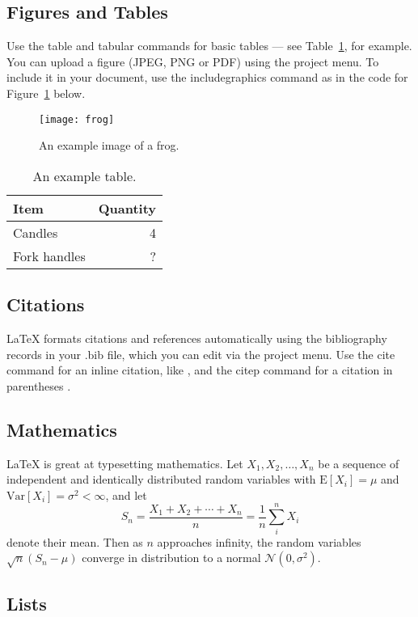\documentclass[fleqn,10pt]{olplainarticle}
\begin{document}
\subsection*{Figures and Tables}

Use the table and tabular commands for basic tables --- see Table~\ref{tab:widgets}, for example. You can upload a figure (JPEG, PNG or PDF) using the project menu. To include it in your document, use the includegraphics command as in the code for Figure~\ref{fig:view} below.

\begin{figure}[ht]
\centering
\texttt{[image: frog]}
\caption{An example image of a frog.}
\label{fig:view}
\end{figure}

\begin{table}[ht]
\centering
\begin{tabular}{l|r}
Item & Quantity \\\hline
Candles & 4 \\
Fork handles & ?  
\end{tabular}
\caption{\label{tab:widgets}An example table.}
\end{table}

\subsection*{Citations}

LaTeX formats citations and references automatically using the bibliography records in your .bib file, which you can edit via the project menu. Use the cite command for an inline citation, like \cite{lees2010theoretical}, and the citep command for a citation in parentheses \citep{lees2010theoretical}.

\subsection*{Mathematics}

\LaTeX{} is great at typesetting mathematics. Let $X_1, X_2, \ldots, X_n$ be a sequence of independent and identically distributed random variables with $\text{E}[X_i] = \mu$ and $\text{Var}[X_i] = \sigma^2 < \infty$, and let
$$S_n = \frac{X_1 + X_2 + \cdots + X_n}{n}
      = \frac{1}{n}\sum_{i}^{n} X_i$$
denote their mean. Then as $n$ approaches infinity, the random variables $\sqrt{n}(S_n - \mu)$ converge in distribution to a normal $\mathcal{N}(0, \sigma^2)$.

\subsection*{Lists}
\end{document}
